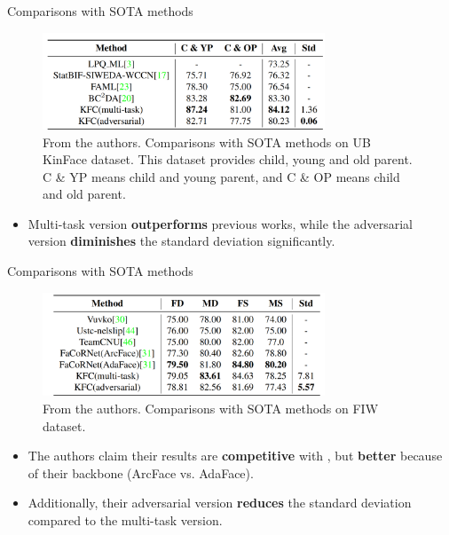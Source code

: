 \documentclass[aspectratio=169,xcolor=dvipsnames]{beamer}
\begin{document}
\begin{frame}{Comparisons with SOTA methods}
    \begin{figure}
        \centering
        \includegraphics[width=0.75\textwidth]{imgs/9_Table5.png}
        \caption{From the authors. Comparisons with SOTA methods on UB KinFace dataset. This dataset provides child, young and old parent. C \& YP means child and young parent, and C \& OP means child and old parent.}
        \label{fig:kfc-comparison-ub}
    \end{figure}
    \begin{itemize}
        \item Multi-task version \textbf{outperforms} previous works, while the adversarial version \textbf{diminishes} the standard deviation significantly.
    \end{itemize}
\end{frame}


\begin{frame}{Comparisons with SOTA methods}
    \begin{figure}
        \centering
        \includegraphics[width=0.75\textwidth]{imgs/10_Table6.png}
        \caption{From the authors. Comparisons with SOTA methods on FIW dataset.}
        \label{fig:kfc-comparison-fiw}
    \end{figure}
    \begin{itemize}
        \item The authors claim their results are \textbf{competitive} with \cite{R31}, but \textbf{better} because of their backbone (ArcFace vs. AdaFace).
        \item Additionally, their adversarial version \textbf{reduces} the standard deviation compared to the multi-task version.
    \end{itemize}
\end{frame}
\end{document}
